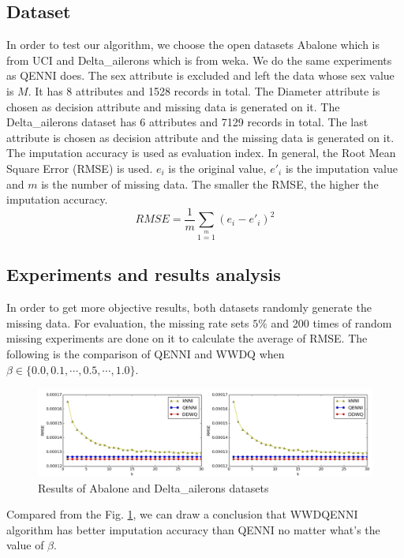 \documentclass[print]{jicspack}
\begin{document}
\subsection{Dataset}
\label{sec:1.1}
In order to test our algorithm, we choose the open datasets Abalone which is from UCI and Delta\_ailerons which is from weka. We do the same experiments as QENNI does. The sex attribute is excluded and left the data whose sex value is $M$. It has 8 attributes and 1528 records in total. The Diameter attribute is chosen as decision attribute and missing data is generated on it. The Delta\_ailerons dataset has 6 attributes and 7129 records in total. The last attribute is chosen as decision attribute and the missing data is generated on it. The imputation accuracy is used as evaluation index. In general, the Root Mean Square Error (RMSE)\cite{RMSE} is used. $e_i$ is the original value, $e'_i$ is the imputation value and $m$ is the number of missing data. The smaller the RMSE, the higher the imputation accuracy.
\begin{equation}
\label{eq:6}
RMSE = \frac{1}{m}\sum\limits_{1=1}\limits^{m}(e_i - e'_i)^2
\end{equation}

\subsection{Experiments and results analysis}
In order to get more objective results, both datasets randomly generate the missing data. For evaluation, the missing rate sets $5\%$ and 200 times of random missing experiments are done on it to calculate the average of RMSE. The following is the comparison of QENNI and WWDQ when $\beta \in \{0.0, 0.1,\cdots,  0.5,\cdots, 1.0\}$.

\begin{figure}[h]
\centering
\includegraphics[angle=0, width=1.0\textwidth]{figure4.png}
\caption{Results of Abalone and Delta\_ailerons datasets}
\label{fig:figure4}
\end{figure}
Compared from the Fig. \ref{fig:figure4}, we can draw a conclusion that WWDQENNI algorithm has better imputation accuracy than QENNI no matter what's the value of $\beta$.
\end{document}
